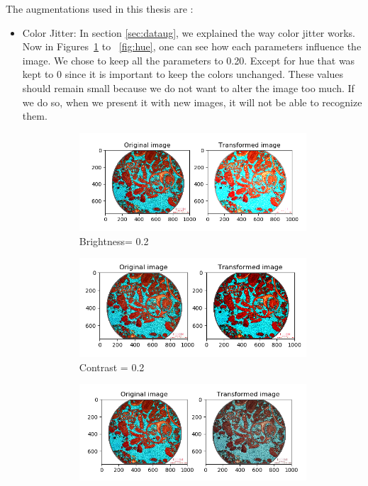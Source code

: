 The augmentations used in this thesis are :
\begin{itemize}
    \item Color Jitter: In section \ref{sec:dataug}, we explained the way color jitter works. Now in Figures~\ref{fig:brightness} to ~\ref{fig:hue}, one can see how each parameters influence the image.
    We chose to keep all the parameters to 0.20. Except for hue that was kept to 0 since it is important to keep the colors unchanged. These values should remain small because we do not want to alter the image too much. If we do so, when we present it with new images, it will not be able to recognize them. 

\begin{figure}
\begin{subfigure}{.5\textwidth}
  \centering
  \includegraphics[width=1\linewidth]{figures/03-bightness08.PNG}
  \caption{Brightness= 0.2}
  \label{fig:brightness}
\end{subfigure}%
\begin{subfigure}{.5\textwidth}
  \centering
  \includegraphics[width=1\linewidth]{figures/03-contrast1.PNG}
  \caption{Contrast = 0.2}
  \label{fig:contrast}
\end{subfigure}
\begin{subfigure}{.5\textwidth}
  \centering
  \includegraphics[width=1\linewidth]{figures/03-saturation0.PNG}

\end{subfigure}
\end{figure}
\end{itemize}
